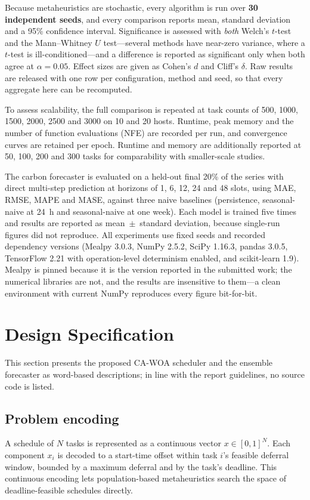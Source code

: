\documentclass[12pt,a4paper]{article}
\begin{document}
Because metaheuristics are stochastic, every algorithm is run over \textbf{30 independent seeds}, and every
comparison reports mean, standard deviation and a 95\% confidence interval. Significance is assessed with
\emph{both} Welch's $t$-test and the Mann--Whitney $U$ test---several methods have near-zero variance, where a
$t$-test is ill-conditioned---and a difference is reported as significant only when both agree at
$\alpha=0.05$. Effect sizes are given as Cohen's $d$ and Cliff's $\delta$. Raw results are released with one
row per configuration, method and seed, so that every aggregate here can be recomputed.

To assess scalability, the full comparison is repeated at task counts of 500, 1000, 1500, 2000, 2500 and 3000
on 10 and 20 hosts. Runtime, peak memory and the number of function evaluations (NFE) are recorded per run,
and convergence curves are retained per epoch. Runtime and memory are additionally reported at 50, 100, 200
and 300 tasks for comparability with smaller-scale studies.

The carbon forecaster is evaluated on a held-out final 20\% of the series with direct multi-step prediction at
horizons of 1, 6, 12, 24 and 48 slots, using MAE, RMSE, MAPE and MASE, against three naive baselines
(persistence, seasonal-naive at 24~h and seasonal-naive at one week). Each model is trained five times and
results are reported as mean~$\pm$~standard deviation, because single-run figures did not reproduce. All
experiments use fixed seeds and recorded dependency versions (Mealpy 3.0.3, NumPy 2.5.2, SciPy 1.16.3,
pandas 3.0.5, TensorFlow 2.21 with operation-level determinism enabled, and scikit-learn 1.9). Mealpy is
pinned because it is the version reported in the submitted work; the numerical libraries are not, and the
results are insensitive to them---a clean environment with current NumPy reproduces every figure
bit-for-bit.

\section{Design Specification}\label{sec:design}
This section presents the proposed CA-WOA scheduler and the ensemble forecaster as word-based descriptions;
in line with the report guidelines, no source code is listed.

\subsection{Problem encoding}
A schedule of $N$ tasks is represented as a continuous vector $x\in[0,1]^N$. Each component $x_i$ is decoded to
a start-time offset within task $i$'s feasible deferral window, bounded by a maximum deferral and by the task's
deadline. This continuous encoding lets population-based metaheuristics search the space of deadline-feasible
schedules directly.
\end{document}
